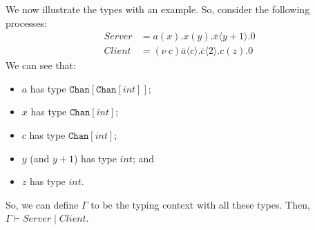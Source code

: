 \documentclass[a4paper, openany]{memoir}
\newcommand{\nfrac}[2]{
    {\displaystyle\frac{#1}{\strut #2}}
  \kern-\nulldelimiterspace}
\theoremstyle{definition}
\begin{document}
    We now illustrate the types with an example. So, consider the following processes:
    \begin{align*}
        \textit{Server} &= a(x).x(y).\overline{x} \langle y + 1 \rangle.0 \\
        \textit{Client} &= (\nu \ c)\overline{a} \langle c \rangle.\overline{c} \langle 2 \rangle.c(z).0
    \end{align*}
    We can see that:
    \begin{itemize}
        \item $a$ has type $\texttt{Chan}[\texttt{Chan}[\textit{int}]]$;
        \item $x$ has type $\texttt{Chan}[\textit{int}]$;
        \item $c$ has type $\texttt{Chan}[\textit{int}]$;
        \item $y$ (and $y+1$) has type $\textit{int}$; and
        \item $z$ has type $\textit{int}$.
    \end{itemize}
    So, we can define $\Gamma$ to be the typing context with all these types. Then, $\Gamma \vdash \textit{Server} \mid \textit{Client}$.

\end{document}
